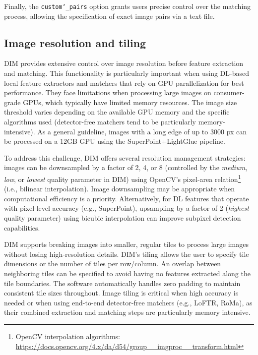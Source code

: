 Finally, the \texttt{custom\char`_pairs} option grants users precise control over the matching process, allowing the specification of exact image pairs via a text file. 

\subsection{Image resolution and tiling}\label{sec:5:tiling}

DIM provides extensive control over image resolution before feature extraction and matching. 
This functionality is particularly important when using DL-based local feature extractors and matchers that rely on GPU parallelization for best performance. 
They face limitations when processing large images on consumer-grade GPUs, which typically have limited memory resources. 
The image size threshold varies depending on the available GPU memory and the specific algorithms used (detector-free matchers tend to be particularly memory-intensive). 
As a general guideline, images with a long edge of up to 3000 px can be processed on a 12GB GPU using the SuperPoint+LightGlue pipeline. 

To address this challenge, DIM offers several resolution management strategies: images can be downsampled by a factor of 2, 4, or 8 (controlled by the \textit{medium}, \textit{low}, or \textit{lowest} quality parameter in DIM) using OpenCV's pixel-area relation\footnote{OpenCV interpolation algorithms: \url{https://docs.opencv.org/4.x/da/d54/group__imgproc__transform.html}} (i.e., bilinear interpolation). 
Image downsampling may be appropriate when computational efficiency is a priority. Alternatively, for DL features that operate with pixel-level accuracy (e.g., SuperPoint), upsampling by a factor of 2 (\textit{highest} quality parameter) using bicubic interpolation can improve subpixel detection capabilities.  

DIM supports breaking images into smaller, regular tiles to process large images without losing high-resolution details.
DIM's tiling allows the user to specify tile dimensions or the number of tiles per row/column.
An overlap between neighboring tiles can be specified to avoid having no features extracted along the tile boundaries. 
The software automatically handles zero padding to maintain consistent tile sizes throughout. 
Image tiling is critical when high accuracy is needed or when using end-to-end detector-free matchers (e.g., LoFTR, RoMa), as their combined extraction and matching steps are particularly memory intensive. 

